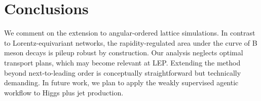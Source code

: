 \section{Conclusions}\label{sec:conclusions}

We comment on the extension to angular-ordered lattice simulations. In
contrast to Lorentz-equivariant networks, the rapidity-regulated area
under the curve of B meson decays is pileup robust by construction. Our
analysis neglects optimal transport plans, which may become relevant at
LEP. Extending the method beyond next-to-leading order is conceptually
straightforward but technically demanding. In future work, we plan to
apply the weakly supervised agentic workflow to Higgs plus jet
production.

